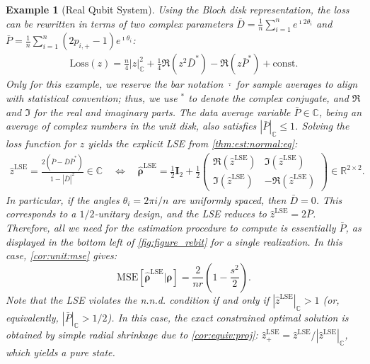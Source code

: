 \documentclass[noinfoline]{imsart}\setcounter{tocdepth}{2}
\renewcommand{\b}[1]{\mathbb{#1}} %
\newcommand{\m}[1]{\mathbf{#1}} %
\newcommand{\mb}[1]{\boldsymbol{#1}} %
\theoremstyle{plain}
\newtheorem{example}[theorem]{Example}
\begin{document}
\begin{example}[Real Qubit System]
Using the Bloch disk representation, the loss can be rewritten in terms of two complex parameters $\bar{D} = \frac{1}{n} \sum_{i=1}^{n} e^{\imath 2\theta_{i}}$ and $\bar{P} = \frac{1}{n} \sum_{i=1}^{n} (2 p_{i, +}-1) e^{\imath \theta_{i}}$:
\begin{align*} 
    \text{Loss}(z) = \frac{n}{4} |z|_{\b{C}}^2 + \frac{1}{4} \Re(z^2 \bar{D}^*) - \Re(z \bar{P}^*) + \text{const}.
\end{align*}
Only for this example, we reserve the bar notation $\bar{\cdot}$ for sample averages to align with statistical convention; thus, we use $^{*}$ to denote the complex conjugate, and $\Re$ and $\Im$ for the real and imaginary parts. The data average variable $\bar{P} \in \b{C}$, being an average of complex numbers in the unit disk, also satisfies $|\bar{P}|_{\b{C}} \le 1$. 
Solving the loss function for $z$ yields the explicit LSE from \cref{thm:est:normal:eq}:
\begin{align*}
    \hat{z}^{\text{LSE}} = \frac{2(\bar{P} - \bar{D} \bar{P}^*)}{1 - |\bar{D}|^2} \in \b{C} \quad \iff \quad
    \hat{\mb{\rho}}^{\text{LSE}} = \frac{1}{2} \m{I}_{2} + \frac{1}{2} \begin{pmatrix}
        \Re (\hat{z}^{\text{LSE}}) & \Im (\hat{z}^{\text{LSE}}) \\
        \Im (\hat{z}^{\text{LSE}}) & - \Re (\hat{z}^{\text{LSE}})
    \end{pmatrix} \in \b{R}^{2 \times 2}.
\end{align*}
In particular, if the angles $\theta_{i} = 2\pi i/n$ are uniformly spaced, then $\bar{D} = 0$. This corresponds to a $1/2$-unitary design, and the LSE reduces to $\hat{z}^{\text{LSE}} = 2 \bar{P}$.
Therefore, all we need for the estimation procedure to compute is essentially $\bar{P}$, as displayed in the bottom left of \cref{fig:figure_rebit} for a single realization.
In this case, \cref{cor:unit:mse} gives:
\begin{equation*}
    \mathrm{MSE}[\hat{\mb{\rho}}^{\text{LSE}} \vert \mb{\rho}] = \frac{2}{nr} \left( 1 - \frac{s^{2}}{2} \right).
\end{equation*}
Note that the LSE violates the n.n.d. condition if and only if $|\hat{z}^{\text{LSE}}|_{\b{C}} > 1$ (or, equivalently, $|\bar{P}|_{\b{C}} > 1/2$). In this case, the exact constrained optimal solution is obtained by simple radial shrinkage due to \cref{cor:equiv:proj}: $\hat{z}_{+}^{\text{LSE}} = \hat{z}^{\text{LSE}}/|\hat{z}^{\text{LSE}}|_{\b{C}}$, which yields a pure state.



\end{example}
\end{document}

